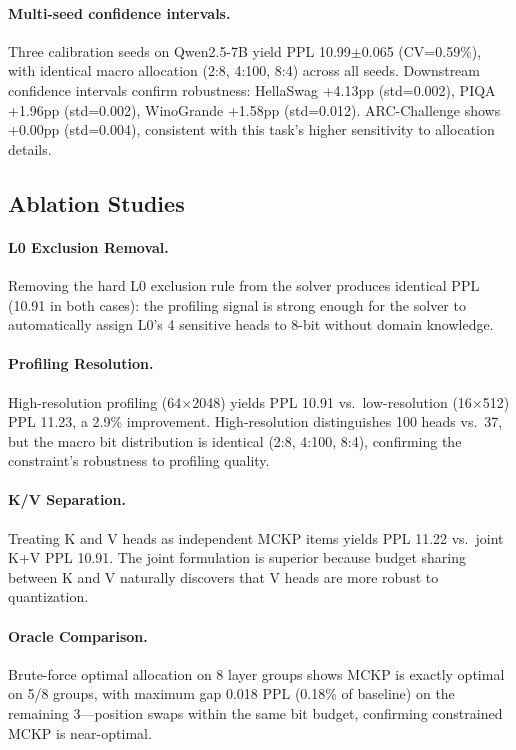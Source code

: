 \documentclass[11pt,a4paper]{article}
\begin{document}
\paragraph{Multi-seed confidence intervals.}
Three calibration seeds on Qwen2.5-7B yield PPL 10.99$\pm$0.065 (CV=0.59\%), with identical macro allocation (2:8, 4:100, 8:4) across all seeds.
Downstream confidence intervals confirm robustness: HellaSwag +4.13pp (std=0.002), PIQA +1.96pp (std=0.002), WinoGrande +1.58pp (std=0.012).
ARC-Challenge shows +0.00pp (std=0.004), consistent with this task's higher sensitivity to allocation details.

\subsection{Ablation Studies}
\label{sec:ablations}

\paragraph{L0 Exclusion Removal.}
Removing the hard L0 exclusion rule from the solver produces identical PPL (10.91 in both cases): the profiling signal is strong enough for the solver to automatically assign L0's 4 sensitive heads to 8-bit without domain knowledge.

\paragraph{Profiling Resolution.}
High-resolution profiling (64$\times$2048) yields PPL 10.91 vs.\ low-resolution (16$\times$512) PPL 11.23, a 2.9\% improvement.
High-resolution distinguishes 100 heads vs.\ 37, but the macro bit distribution is identical (2:8, 4:100, 8:4), confirming the constraint's robustness to profiling quality.

\paragraph{K/V Separation.}
Treating K and V heads as independent MCKP items yields PPL 11.22 vs.\ joint K+V PPL 10.91.
The joint formulation is superior because budget sharing between K and V naturally discovers that V heads are more robust to quantization.

\paragraph{Oracle Comparison.}
Brute-force optimal allocation on 8 layer groups shows MCKP is exactly optimal on 5/8 groups, with maximum gap 0.018 PPL (0.18\% of baseline) on the remaining 3---position swaps within the same bit budget, confirming constrained MCKP is near-optimal.
\end{document}
